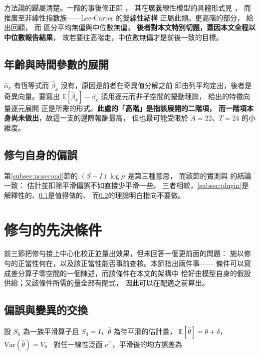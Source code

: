 \documentclass[UTF8, fontset=macnew, a4paper, 12pt]{ctexart}
\newcommand{\Ex}{\mathbb{E}}
\begin{document}
方法論的歸屬清楚。一階的事後修正即 \citet{coxsnell1968}，
其在廣義線性模型的具體形式見 \citet{cordeiro1991}，
而 \citet{kosmidis2009} 推廣至非線性指數族——Lee-Carter 的雙線性結構
正屬此類。更高階的部分，\citet{kosmidis2014} 給出回顧，
而 \citet{kennepagui2017} 區分平均無偏與中位數無偏。
\textbf{後者對本文特別切題，蓋因本文全程以中位數報告結果}，
故若要往高階走，中位數無偏才是前後一致的目標。

\subsection{年齡與時間參數的展開}\label{subsec:beta-order}

$\hat\alpha_x$ 有恆等式而 $\hat\beta_x$ 沒有，原因是前者在奇異值分解之前
即由列平均定出，後者是奇異向量。要寫出 $\Ex[\hat\beta_x]-\beta_x$
須用逐元而非子空間的擾動理論，\citet{abbe2020} 給出的特徵向量逐元展開
正是所需的形式。\textbf{此處的「高階」是指該展開的二階項， 而一階項本身尚未做出}，故這一支的邊際報酬最高，
但也最可能受限於 $A=22$、$T=24$ 的小維度。

\subsection{修勻自身的偏誤}\label{subsec:smooth-order}

第\ref{subsec:nosecond}節的 $(S-I)\log\mu$ 是第三種意思，
而該節的實測與 \citet{calonico2018} 的結論一致：
估計並扣除平滑偏誤不如直接少平滑一些。
三者相較，\ref{subsec:plugin}是解釋性的、\ref{subsec:beta-order}是值得做的、
而\ref{subsec:smooth-order}的理論明白指向不要做。

\section{修勻的先決條件}\label{sec:precond}

前三節把修勻接上中心化校正並量出效果，但未回答一個更前面的問題：
施以修勻的正當性何在，以及該正當性能否事前查核。本節指出兩件事——
條件可以寫成差分算子零空間的一個陳述，而該條件在本文的架構中
恰好由模型自身的假設供給；又該條件所需的量全部有閉式，
因此可以在配適之前算出。

\subsection{偏誤與變異的交換}\label{subsec:tradeoff}

設 $S_h$ 為一族平滑算子且 $S_0=I$，$\hat\theta$ 為待平滑的估計量，
$\Ex[\hat\theta]=\theta+\delta$，$\mathrm{Var}(\hat\theta)=V$。
對任一線性泛函 $c^{\top}$，平滑後的均方誤差為
\end{document}
